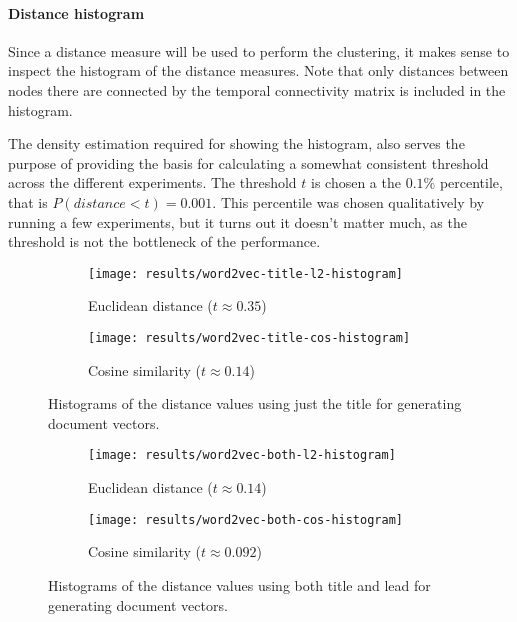 \paragraph{Distance histogram} Since a distance measure will be used to perform the clustering, it makes sense to inspect the histogram of the distance measures. Note that only distances between nodes there are connected by the temporal connectivity matrix is included in the histogram.

The density estimation required for showing the histogram, also serves the purpose of providing the basis for calculating a somewhat consistent threshold across the different experiments. The threshold $t$ is chosen a the $0.1 \%$ percentile, that is $P(distance < t) = 0.001$. This percentile was chosen qualitatively by running a few experiments, but it turns out it doesn't matter much, as the threshold is not the bottleneck of the performance.

\begin{figure}[H]
        \centering
        \begin{subfigure}[b]{0.49\textwidth}
                \texttt{[image: results/word2vec-title-l2-histogram]}
                \caption{Euclidean distance ($t \approx 0.35$)}
        \end{subfigure}
        \begin{subfigure}[b]{0.49\textwidth}
                \texttt{[image: results/word2vec-title-cos-histogram]}
                \caption{Cosine similarity ($t \approx 0.14$)}
        \end{subfigure}
        \caption{Histograms of the distance values using just the title for generating document vectors.}
\end{figure}
\begin{figure}[H]
        \centering
        \begin{subfigure}[b]{0.49\textwidth}
                \texttt{[image: results/word2vec-both-l2-histogram]}
                \caption{Euclidean distance ($t \approx 0.14$)}
        \end{subfigure}
        \begin{subfigure}[b]{0.49\textwidth}
                \texttt{[image: results/word2vec-both-cos-histogram]}
                \caption{Cosine similarity ($t \approx 0.092$)}
        \end{subfigure}
        \caption{Histograms of the distance values using both title and lead for generating document vectors.}
\end{figure}

